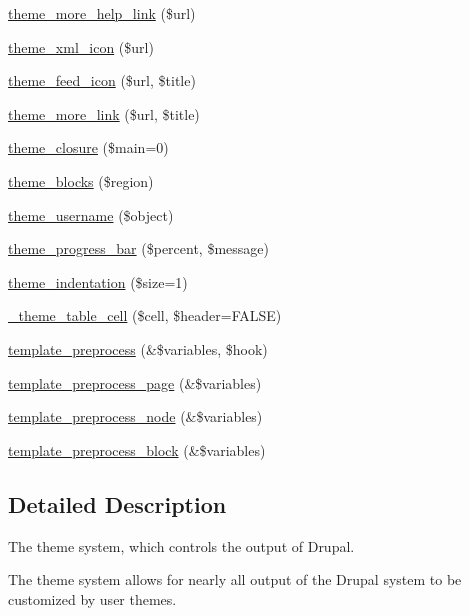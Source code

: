 \begin{CompactItemize}
\item 
\hyperlink{group__themeable_ga0b3233e46dcfc24ecab60b769c6caab}{theme\_\-more\_\-help\_\-link} (\$url)
\item 
\hyperlink{group__themeable_ga9cac9d4b695e8c4edd9e324adc0c9fb}{theme\_\-xml\_\-icon} (\$url)
\item 
\hyperlink{group__themeable_ge5d10f67376dfa4cd18256bf1d496169}{theme\_\-feed\_\-icon} (\$url, \$title)
\item 
\hyperlink{group__themeable_ge54d44857d9145119af69cd97018278f}{theme\_\-more\_\-link} (\$url, \$title)
\item 
\hyperlink{group__themeable_gfc75590efceee02ad1c120d060d628ae}{theme\_\-closure} (\$main=0)
\item 
\hyperlink{group__themeable_g248f091cf3b4cb0d194933c052e44740}{theme\_\-blocks} (\$region)
\item 
\hyperlink{group__themeable_gf08895a75b95547417a302272e0b027c}{theme\_\-username} (\$object)
\item 
\hyperlink{group__themeable_g929fbdc2cc220d02dd1da889232991ff}{theme\_\-progress\_\-bar} (\$percent, \$message)
\item 
\hyperlink{group__themeable_g3fb21186ce53fffb040c3e1db1504671}{theme\_\-indentation} (\$size=1)
\item 
\hyperlink{includes_2theme_8inc_df2a29e2c6631b7c0ecd833cafda9b40}{\_\-theme\_\-table\_\-cell} (\$cell, \$header=FALSE)
\item 
\hyperlink{includes_2theme_8inc_3eeb7bcdba7ef4859f99586da264d347}{template\_\-preprocess} (\&\$variables, \$hook)
\item 
\hyperlink{includes_2theme_8inc_128dae24f990d8ba4710ac78b0584c11}{template\_\-preprocess\_\-page} (\&\$variables)
\item 
\hyperlink{includes_2theme_8inc_bba818ede4c18fb7d92f0a5d5f1aa771}{template\_\-preprocess\_\-node} (\&\$variables)
\item 
\hyperlink{includes_2theme_8inc_f4bcb538ddb98ffdd9ec8037631f10fa}{template\_\-preprocess\_\-block} (\&\$variables)
\end{CompactItemize}


\subsection{Detailed Description}
The theme system, which controls the output of Drupal.

The theme system allows for nearly all output of the Drupal system to be customized by user themes. 

